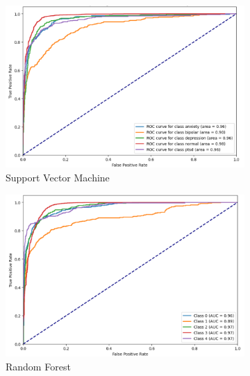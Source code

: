 \begin{figure}[H]
\begin{subfigure}[b]{0.49\textwidth}
        \centering
        \includegraphics[width=\textwidth]{Images/SVM ROC.png}
        \caption*{Support Vector Machine}
        \label{SVMROC}  %
    \end{subfigure}
    \hfill
    \vspace{0.75cm}
    \begin{subfigure}[b]{0.49\textwidth}
        \centering
        \includegraphics[width=\textwidth]{Images/RF ROC.png}
        \caption*{Random Forest}
        \label{RFROC}  %
    \end{subfigure}\
    \hfill
    \begin{subfigure}[b]{0.49\textwidth}
        \centering

\end{subfigure}
\end{figure}
